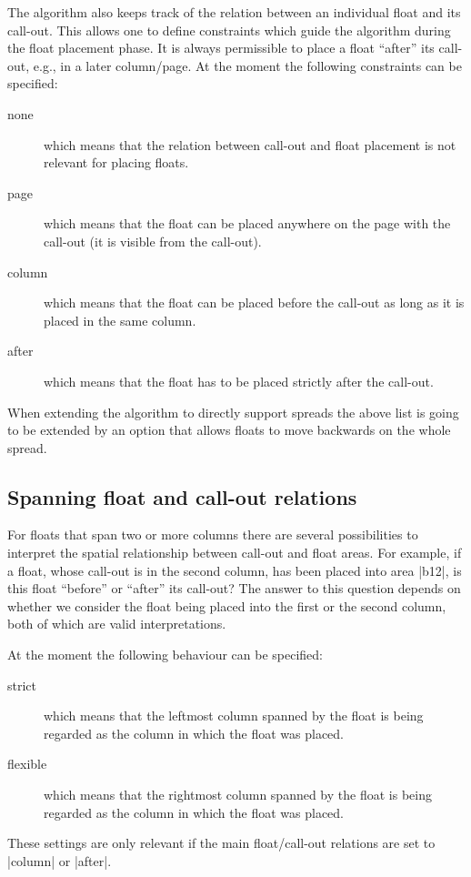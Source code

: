 \documentclass[twocolumn]{article}
\begin{document}
The algorithm also keeps track of the relation between an individual
float and its call-out. This allows one to define constraints which
guide the algorithm during the float placement phase. It is always
permissible to place a float ``after'' its call-out, e.g., in a later
column/\allowbreak page. At the moment the following constraints can
be specified:
\begin{description}
\item[none] which means that the relation between call-out and float
placement is not relevant for placing floats.
\item[page] which means that the float can be placed anywhere on the
page with the call-out (it is visible from the call-out).
\item[column] which means that the float can be placed before the
call-out as long as it is placed in the same column.
\item[after] which means that the float has to be placed strictly
after the call-out.
\end{description}
When extending the algorithm to directly support spreads the
above list is going to be extended by an option that allows floats to
move backwards on the whole spread.




\subsection{Spanning float and call-out relations} \label{fl-span-relation}

For floats that span two or more columns there are several
possibilities to interpret the spatial relationship between call-out
and float areas. For example, if a float, whose call-out is in the
second column, has been placed into area |b12|, is this float
``before'' or ``after'' its call-out? The answer to this question
depends on whether we consider the float being placed into the first
or the second column, both of which are valid interpretations.

At the moment the following behaviour can be specified:
\begin{description}
\item[strict] which means that the leftmost column spanned
  by the float is being regarded as the column in which the float was placed.
\item[flexible] which means that the rightmost column spanned 
  by the float is being regarded as the column in which the float was placed.
\end{description}
These settings are only relevant if the main float/call-out relations
are set to |column| or |after|.
\end{document}
